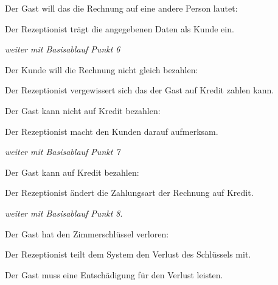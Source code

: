 \begin{longenum}
\begin{longenum}
	\item Der \Gls{Gast} will das die Rechnung auf eine andere Person lautet:
		\begin{longenum}
			\item Der \Gls{Rezeptionist} trägt die angegebenen Daten als \Gls{Kunde} ein.
			\item \emph{weiter mit Basisablauf Punkt 6}
		\end{longenum}
	\end{longenum}
	\item
	\item
	\begin{longenum}
		\item Der \Gls{Kunde} will die Rechnung nicht gleich bezahlen:
		\begin{longenum}
			\item Der \Gls{Rezeptionist} vergewissert sich das der \Gls{Gast} auf Kredit
			zahlen kann.
			\begin{longenum}
				\item Der \Gls{Gast} kann nicht auf Kredit bezahlen:
				\begin{longenum}
					\item Der \Gls{Rezeptionist} macht den Kunden darauf aufmerksam.
					\item \emph{weiter mit Basisablauf Punkt 7}
				\end{longenum}
			\end{longenum}
			\begin{longenum}
				\item Der \Gls{Gast} kann auf Kredit bezahlen:
				\begin{longenum}
					\item Der \Gls{Rezeptionist} ändert die Zahlungsart der \Gls{Rechnung} auf
					Kredit.
					\item \emph{weiter mit Basisablauf Punkt 8}.
				\end{longenum}
			\end{longenum}
		\end{longenum}
	\end{longenum}
	\item
	\item
	\begin{longenum}
		\item Der \Gls{Gast} hat den Zimmerschlüssel verloren:
		\begin{longenum}
			\item Der \Gls{Rezeptionist} teilt dem System den Verlust des Schlüssels mit.
			\item Der \Gls{Gast} muss eine Entschädigung für den Verlust leisten.
		\end{longenum}
	\end{longenum}
\end{longenum}

